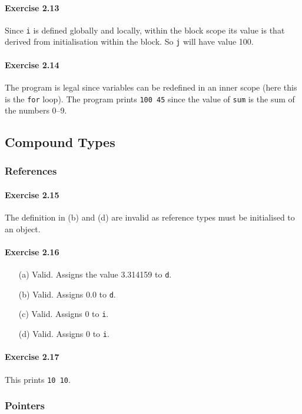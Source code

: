 \paragraph{Exercise 2.13}
Since \texttt{i} is defined globally and locally, within the block scope its value is that derived from initialisation within the block. So \texttt{j} will have value 100.

\paragraph{Exercise 2.14}
The program is legal since variables can be redefined in an inner scope (here this is the \texttt{for} loop). The program prints \texttt{100 45} since the value of \texttt{sum} is the sum of the numbers 0--9.

\subsection{Compound Types}

\subsubsection{References}

\paragraph{Exercise 2.15}
The definition in (b) and (d) are invalid as reference types must be initialised to an object.

\paragraph{Exercise 2.16}
\begin{itemize}
	\item [(a)]
		Valid. Assigns the value 3.314159 to \texttt{d}.
	\item [(b)]
		Valid. Assigns 0.0 to \texttt{d}.
	\item [(c)]
		Valid. Assigns 0 to \texttt{i}.
	\item [(d)]
		Valid. Assigns 0 to \texttt{i}.
\end{itemize}

\paragraph{Exercise 2.17}
This prints \texttt{10 10}.

\subsubsection{Pointers}

